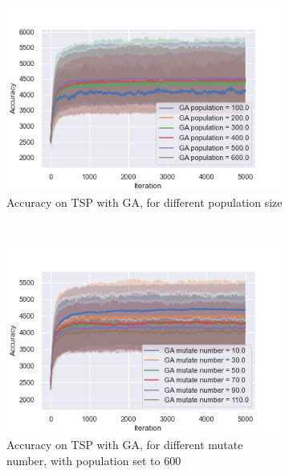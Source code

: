 \documentclass[twocolumn, 10pt]{article}
\begin{document}
				\begin{figure}[h]
					\centering
					\begin{subfigure}[t]{0.32\columnwidth}
						\centering
						\includegraphics[width=\linewidth]{../graphics/tsp_GA_Iteration_Error_GA_population.png}
						\caption{Accuracy on TSP with GA, for different population size}
						\label{tsp:ga_pop}
					\end{subfigure}
					~
					\begin{subfigure}[t]{0.32\columnwidth}
						\centering
						\includegraphics[width=\linewidth]{../graphics/tsp_GA_Iteration_Error_GA_mutate_number.png}
						\caption{Accuracy on TSP with GA, for different mutate number, with population set to 600}
						\label{tsp:ga_mutate}
					\end{subfigure}
					~
					\begin{subfigure}[t]{0.32\columnwidth}
						\centering

\end{subfigure}
\end{figure}
\end{document}
